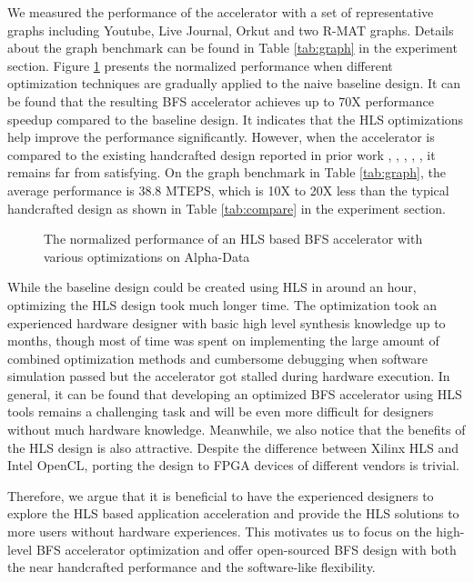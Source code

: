 We measured the performance of the accelerator with a set of representative graphs 
including Youtube, Live Journal, Orkut and two R-MAT graphs. Details about the 
graph benchmark can be found in Table \ref{tab:graph} in the experiment section. 
Figure \ref{fig:opt-performance} presents the normalized performance
when different optimization techniques are gradually applied to the naive baseline design.
It can be found that the resulting BFS accelerator achieves up to 70X performance speedup
compared to the baseline design. It indicates that the HLS optimizations help improve the 
performance significantly. However, when the accelerator is compared to the existing 
handcrafted design reported in prior work \cite{betkaoui2012reconfigurable}, 
\cite{attia2014cygraph}, \cite{zhang2017boosting}, \cite{nurvitadhi2014graphgen},
\cite{dai2016fpgp}, it remains far from satisfying. On the graph benchmark in Table \ref{tab:graph}, 
the average performance is 38.8 MTEPS, which is 10X to 20X less than the typical handcrafted 
design as shown in Table \ref{tab:compare} in the experiment section.

\begin{figure}
    \caption{The normalized performance of an HLS based BFS accelerator with various optimizations on Alpha-Data}
\label{fig:opt-performance}
\vspace{-1em}
\end{figure}

While the baseline design could be created using HLS in around an hour, optimizing the 
HLS design took much longer time. The optimization took an experienced hardware designer 
with basic high level synthesis knowledge up to months, though most of time was 
spent on implementing the large amount of combined optimization methods and cumbersome
debugging when software simulation passed but the accelerator got stalled 
during hardware execution. In general, it can be found that developing an optimized BFS 
accelerator using HLS tools remains a challenging task and will be even more difficult for 
designers without much hardware knowledge. Meanwhile, we also notice that the benefits of 
the HLS design is also attractive. Despite the difference between Xilinx HLS 
and Intel OpenCL, porting the design to FPGA devices of different vendors is trivial. 

Therefore, we argue that it is beneficial to have the experienced designers to explore the HLS based 
application acceleration and provide the HLS solutions to more users without hardware 
experiences. This motivates us to focus on the high-level BFS accelerator optimization
and offer open-sourced BFS design with both the near handcrafted performance and 
the software-like flexibility.

